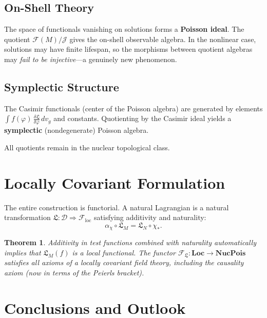 \documentclass[11pt,a4paper]{article}
\newtheorem{theorem}{Theorem}[section]
\begin{document}
\subsection{On-Shell Theory}

The space of functionals vanishing on solutions forms a \textbf{Poisson ideal}.
The quotient $\mathscr{F}(M)/\mathcal{J}$ gives the on-shell observable
algebra. In the nonlinear case, solutions may have finite lifespan, so
the morphisms between quotient algebras may \emph{fail to be injective}---a
genuinely new phenomenon.

\subsection{Symplectic Structure}

The Casimir functionals (center of the Poisson algebra) are generated by
elements $\int f(\varphi)\,\frac{\delta\mathfrak{L}}{\delta\varphi}\, dv_g$
and constants. Quotienting by the Casimir ideal yields a \textbf{symplectic}
(nondegenerate) Poisson algebra.

All quotients remain in the nuclear topological class.

\section{Locally Covariant Formulation}

The entire construction is functorial. A natural Lagrangian is a natural
transformation $\mathfrak{L}: \mathcal{D} \Rightarrow \mathscr{F}_{\mathrm{loc}}$
satisfying additivity and naturality:
\begin{equation}
  \alpha_\chi \circ \mathfrak{L}_M = \mathfrak{L}_N \circ \chi_*.
\end{equation}

\begin{theorem}
Additivity in test functions combined with naturality automatically implies
that $\mathfrak{L}_M(f)$ is a local functional. The functor
$\mathscr{F}_{\mathfrak{L}}: \mathbf{Loc} \to \mathbf{NucPois}$ satisfies
all axioms of a locally covariant field theory, including the causality axiom
(now in terms of the Peierls bracket).
\end{theorem}

\section{Conclusions and Outlook}
\end{document}
